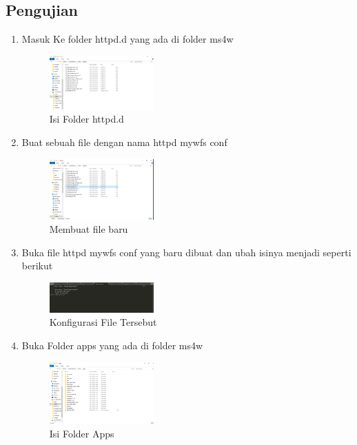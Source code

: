\subsection{Pengujian}
\begin{enumerate}
  \item Masuk Ke folder httpd.d yang ada di folder ms4w
  \hfill\break
    \begin{figure}[H]
		\includegraphics[width=4cm]{figures/1174039/tugas4/10.png}
		\centering
		\caption{Isi Folder httpd.d}
    \end{figure}
  \item Buat sebuah file dengan nama httpd mywfs conf
  \hfill\break
    \begin{figure}[H]
		\includegraphics[width=4cm]{figures/1174039/tugas4/11.png}
		\centering
		\caption{Membuat file baru}
    \end{figure}
  \item Buka file httpd mywfs conf yang baru dibuat dan ubah isinya menjadi seperti berikut
  \hfill\break
    \begin{figure}[H]
		\includegraphics[width=4cm]{figures/1174039/tugas4/12.png}
		\centering
		\caption{Konfigurasi File Tersebut}
    \end{figure}
  \item Buka Folder apps yang ada di folder ms4w
  \hfill\break
    \begin{figure}[H]
		\includegraphics[width=4cm]{figures/1174039/tugas4/13.png}
		\centering
		\caption{Isi Folder Apps}
    \end{figure}

\end{enumerate}
